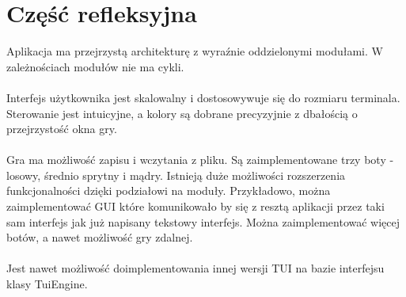 \documentclass[12pt, titlepage]{article}
\begin{document}
\pagebreak
\section{Część refleksyjna}
Aplikacja ma przejrzystą architekturę z wyraźnie
oddzielonymi modułami. W zależnościach modułów nie
ma cykli. 
\\~\\
Interfejs użytkownika jest skalowalny i dostosowywuje się
do rozmiaru terminala. Sterowanie jest intuicyjne, a kolory
są dobrane precyzyjnie z dbałością o przejrzystość okna gry.
\\~\\
Gra ma możliwość zapisu i wczytania z pliku. Są zaimplementowane
trzy boty - losowy, średnio sprytny i mądry. Istnieją duże możliwości
rozszerzenia
funkcjonalności dzięki podziałowi na moduły. Przykładowo, można
zaimplementować GUI które komunikowało by
się z resztą aplikacji przez taki sam interfejs jak już
napisany tekstowy interfejs. Można
zaimplementować więcej botów, a nawet możliwość gry zdalnej.
\\~\\
Jest nawet możliwość doimplementowania innej wersji TUI na
bazie interfejsu klasy TuiEngine.
\end{document}
